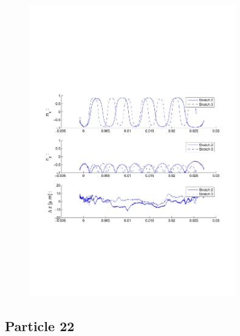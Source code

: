 \begin{figure}[H]

\centering

\includegraphics[width=0.8\textwidth]{Images/Particle 16/Stretch2.pdf}

\end{figure}



\subsection{Particle 22}

